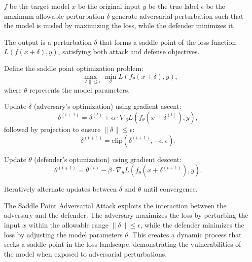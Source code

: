 \( f \) be the target model
\( x \) be the original input 
\( y \) be the true label
\( \epsilon \) be the maximum allowable perturbation
\( \delta \) generate adversarial perturbation such that the model is misled by maximizing the loss, while the defender minimizes it.

The output is a perturbation \( \delta \) that forms a saddle point of the loss function \( L(f(x + \delta), y) \), satisfying both attack and defense objectives.

Define the saddle point optimization problem:
   \[
   \max_{\|\delta\| \leq \epsilon} \min_{\theta} L(f_\theta(x + \delta), y),
   \]
   where \( \theta \) represents the model parameters.

Update \( \delta \) (adversary's optimization) using gradient ascent:
   \[
   \delta^{(t+1)} = \delta^{(t)} + \alpha \cdot \nabla_\delta L(f_\theta(x + \delta^{(t)}), y),
   \]
   followed by projection to ensure \( \|\delta\| \leq \epsilon \):
   \[
   \delta^{(t+1)} = \text{clip}(\delta^{(t+1)}, -\epsilon, \epsilon).
   \]

Update \( \theta \) (defender's optimization) using gradient descent:
   \[
   \theta^{(t+1)} = \theta^{(t)} - \beta \cdot \nabla_\theta L(f_\theta(x + \delta^{(t+1)}), y).
   \]

Iteratively alternate updates between \( \delta \) and \( \theta \) until convergence.

The Saddle Point Adversarial Attack exploits the interaction between the adversary and the defender. The adversary maximizes the loss by perturbing the input \( x \) within the allowable range \( \|\delta\| \leq \epsilon \), while the defender minimizes the loss by adjusting the model parameters \( \theta \). This creates a dynamic process that seeks a saddle point in the loss landscape, demonstrating the vulnerabilities of the model when exposed to adversarial perturbations.